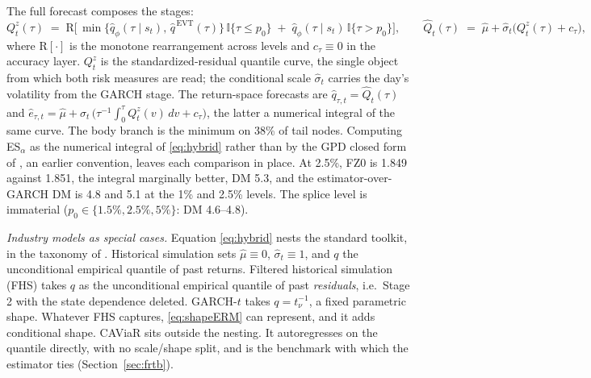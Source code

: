 \documentclass[11pt]{article}
\theoremstyle{remark}
\begin{document}
The full forecast composes the stages:
\begin{equation}
Q^{z}_t(\tau) \;=\;
\mathrm{R}\Big[\, \min\{\widehat{q}_\phi(\tau \mid s_t),\,
\widehat{q}^{\,\mathrm{EVT}}(\tau)\}\,\mathbb{I}\{\tau \le p_0\}
\;+\; \widehat{q}_\phi(\tau \mid s_t)\,\mathbb{I}\{\tau > p_0\}
\Big],\qquad
\widehat{Q}_t(\tau) \;=\; \widehat{\mu} + \widehat{\sigma}_t \big(Q^{z}_t(\tau) + c_\tau\big),
\label{eq:hybrid}
\end{equation}
where $\mathrm{R}[\cdot]$ is the monotone rearrangement across
levels \citep{cherno2010rearr} and $c_\tau\equiv0$ in the accuracy layer. $Q^{z}_t$ is the standardized-residual quantile curve, the single object from which both risk measures are read; the conditional scale $\widehat{\sigma}_t$ carries the day's volatility from the GARCH stage. The return-space forecasts are $\widehat{q}_{\tau,t}=\widehat{Q}_t(\tau)$
and $\widehat{e}_{\tau,t}=\widehat{\mu}+\widehat{\sigma}_t\,\big(\tau^{-1}\!\int_0^\tau Q^{z}_t(v)\,dv + c_\tau\big)$, the latter a numerical integral of the same curve.
The body branch is the minimum on 38\% of tail nodes. Computing ES$_\alpha$ as the numerical integral of \eqref{eq:hybrid} rather than by the GPD closed form of \citet{mcneilfrey2000}, an earlier convention, leaves each comparison in place. At 2.5\%, FZ0 is 1.849 against 1.851, the integral marginally better, DM 5.3, and the estimator-over-GARCH DM is 4.8 and 5.1 at the 1\% and 2.5\% levels. The splice level is immaterial ($p_0\in\{1.5\%,2.5\%,5\%\}$: DM 4.6--4.8).

\noindent\emph{Industry models as special cases.} Equation \eqref{eq:hybrid} nests the standard toolkit, in the taxonomy of \citet{kuester2006}. Historical simulation sets $\widehat{\mu}\equiv 0$, $\widehat{\sigma}_t \equiv 1$, and $q$ the unconditional empirical quantile of past returns. Filtered historical simulation (FHS) \citep{baroneadesi1999fhs, hullwhite1998} takes $q$ as the unconditional empirical quantile of past \emph{residuals}, i.e.\ Stage 2 with the state dependence deleted. GARCH-$t$ \citep{bollerslev1987} takes $q = t_\nu^{-1}$, a fixed parametric shape. Whatever FHS captures, \eqref{eq:shapeERM} can represent, and it adds conditional shape. CAViaR \citep{engle2004caviar} sits outside the nesting. It autoregresses on the quantile directly, with no scale/shape split, and is the benchmark with which the estimator ties (Section~\ref{sec:frtb}).
\end{document}
